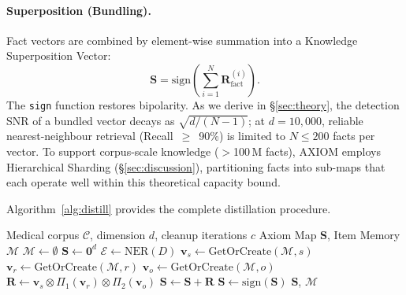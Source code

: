 \documentclass[11pt,a4paper]{article}
\begin{document}
\paragraph{Superposition (Bundling).}
Fact vectors are combined by element-wise summation into a
Knowledge Superposition Vector:
\begin{equation}
    \mathbf{S} = \text{sign}\!\left(\sum_{i=1}^{N}
    \mathbf{R}_{\text{fact}}^{(i)}\right).
    \label{eq:bundling}
\end{equation}
The \texttt{sign} function restores bipolarity.  As we derive in
\S\ref{sec:theory}, the detection SNR of a bundled vector decays as
$\sqrt{d/(N-1)}$; at $d = 10{,}000$, reliable nearest-neighbour
retrieval (Recall~$\geq$~90\%) is limited to
$N \leq 200$ facts per vector.  To support corpus-scale knowledge
($>$100\,M facts), AXIOM employs Hierarchical Sharding
(\S\ref{sec:discussion}), partitioning facts into sub-maps that each
operate well within this theoretical capacity bound.

Algorithm~\ref{alg:distill} provides the complete distillation procedure.

\begin{algorithm}[t]
\caption{AXIOM Distillation Pipeline}
\label{alg:distill}
\begin{algorithmic}[1]
\Require Medical corpus $\mathcal{C}$, dimension $d$, cleanup iterations $c$
\Ensure Axiom Map $\mathbf{S}$, Item Memory $\mathcal{M}$
\State $\mathcal{M} \gets \emptyset$ 
\State $\mathbf{S} \gets \mathbf{0}^d$ 
    \State $\mathcal{E} \gets \text{NER}(D)$ 
        \State $\mathbf{v}_s \gets \text{GetOrCreate}(\mathcal{M}, s)$
        \State $\mathbf{v}_r \gets \text{GetOrCreate}(\mathcal{M}, r)$
        \State $\mathbf{v}_o \gets \text{GetOrCreate}(\mathcal{M}, o)$
        \State $\mathbf{R} \gets \mathbf{v}_s \otimes \Pi_1(\mathbf{v}_r)
               \otimes \Pi_2(\mathbf{v}_o)$
        \State $\mathbf{S} \gets \mathbf{S} + \mathbf{R}$
    \EndFor
\EndFor
{}
    \State $\mathbf{S} \gets \text{sign}(\mathbf{S})$ 
\EndFor
\State \Return $\mathbf{S}$, $\mathcal{M}$
\end{algorithmic}
\end{algorithm}
\end{document}
